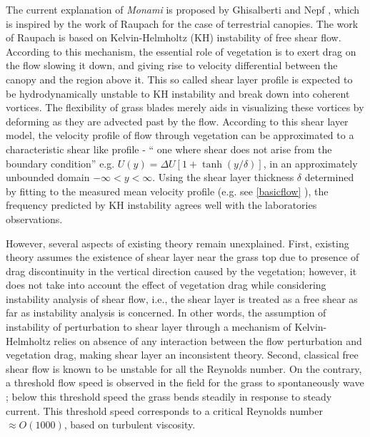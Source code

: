 \documentclass[12pt]{report}   %
\begin{document}
The current explanation of \textit{Monami} is proposed by Ghisalberti and Nepf \cite{Ghisal02,Nepf00}, which is inspired by the work of Raupach \cite{Raupach94,Raupach96} for the case of terrestrial canopies. The work of Raupach \cite{Raupach94,Raupach96} is based on Kelvin-Helmholtz (KH) instability of free shear flow. According to this mechanism, the essential role of vegetation is to exert drag on the flow slowing it down, and giving rise to velocity differential between the canopy and the region above it. This so called shear layer profile is expected to be hydrodynamically unstable to KH instability and break down into coherent vortices. The flexibility of grass blades merely aids in visualizing these vortices by deforming as they are advected past by the flow.
According to this shear layer model, the velocity profile of flow through vegetation can be approximated to a characteristic shear like profile - `` one where shear does not arise from the boundary condition'' e.g. $U(y) = \Delta U[1+\tanh(y/\delta)]$, in an approximately unbounded domain $-\infty < y< \infty$. Using the shear layer thickness $\delta$ determined by fitting to the measured mean velocity profile (e.g. see \ref{basicflow} ), the frequency predicted by KH instability agrees well with the laboratories observations.

However, several aspects of existing theory remain unexplained. First, existing theory assumes the existence of shear layer near the grass top due to presence of drag discontinuity in the vertical direction caused by the vegetation; however, it does not take into account the effect of vegetation drag while considering instability analysis of shear flow, i.e., the shear layer is treated as a free shear as far as instability analysis is concerned. In other words, the assumption of instability of perturbation to shear layer through a mechanism of Kelvin-Helmholtz relies on absence of any interaction between the flow perturbation and vegetation drag, making shear layer an inconsistent theory. Second, classical free shear flow is known to be unstable for all the Reynolds number. On the contrary, a threshold flow speed is observed in the field for the grass to spontaneously wave \cite{Grizzle96}; below this threshold speed the grass bends steadily in response to steady current. This threshold speed corresponds 
to a  critical Reynolds number $\approx O(1000)$, based on turbulent viscosity. 
 
\end{document}
